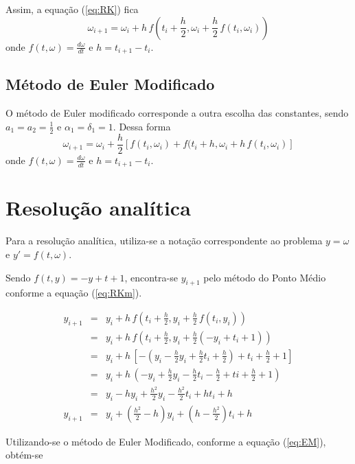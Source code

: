 \documentclass[brazilian, 12pt, a4paper, final]{article}
\begin{document}
Assim, a equação (\ref{eq:RK}) fica 
\begin{equation}\label{eq:RKm}
  \omega_{i+1}=\omega_{i}+h\,f\left(t_i+\frac{h}{2}, \omega_i+\frac{h}{2}\, f(t_i,\omega_i)\right)  
\end{equation}
\noindent
onde $f(t,\omega)=\frac{d\omega}{dt}$ e $h=t_{i+1}-t_{i}$.

\subsection{Método de Euler Modificado}
O método de Euler modificado corresponde a outra escolha das constantes, sendo $a_1=a_2=\frac{1}{2}$ e $\alpha_1=\delta_1=1$. Dessa forma
\begin{equation}\label{eq:EM}
  \omega_{i+1}=\omega_{i} + \frac{h}{2}[f(t_i,\omega_i)+f(t_i+h, \omega_i+h\,f(t_i,\omega_i)]
\end{equation}
\noindent
onde $f(t,\omega)=\frac{d\omega}{dt}$ e $h=t_{i+1}-t_{i}$.

\section{Resolução analítica}
Para a resolução analítica, utiliza-se a notação  correspondente ao problema $y=\omega$ e $y'=f(t,\omega)$.

Sendo $f(t,y)=-y+t+1$, encontra-se $y_{i+1}$ pelo método do Ponto Médio conforme a equação (\ref{eq:RKm}).

\begin{eqnarray}
  y_{i+1}&=&y_i+h\, f(t_i+\frac{h}{2},y_i+\frac{h}{2}\,f(t_i,y_i)) \nonumber \\
  &=&y_i+h\, f(t_i+\frac{h}{2}, y_i+\frac{h}{2}(-y_i+t_i+1)) \nonumber \\
  &=&y_i+h\, [-(y_i-\frac{h}{2}y_i+\frac{h}{2}t_i+\frac{h}{2})+t_i+\frac{h}{2}+1] \nonumber \\
  &=&y_i+h\,(-y_i+\frac{h}{2}y_i-\frac{h}{2}t_i-\frac{h}{2}+ti+\frac{h}{2}+1) \nonumber \\
  &=&y_i-hy_i+\frac{h^2}{2}y_i-\frac{h^2}{2}t_i+ht_i+h \nonumber \\
  y_{i+1}&=&y_i+\left(\frac{h^2}{2}-h\right)y_i+\left(h-\frac{h^2}{2}\right)t_i+h \label{eq:5}
\end{eqnarray}

Utilizando-se o método de Euler Modificado, conforme a equação (\ref{eq:EM}), obtém-se
\end{document}
